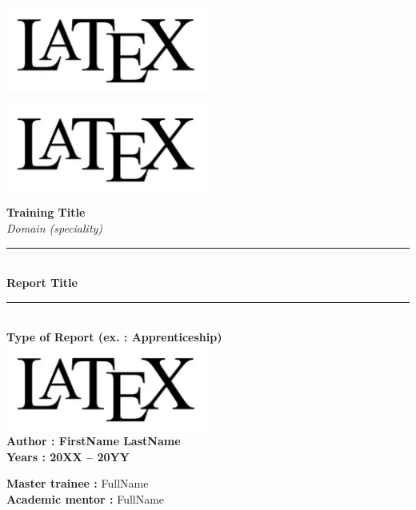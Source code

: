 
\begin{titlepage}
    \begin{minipage}{0.49\textwidth}
        \raggedright
        \includegraphics[width=0.5\textwidth]{images/latext_logo.png} %
    \end{minipage}
    \hfill
    \begin{minipage}{0.49\textwidth}
        \raggedleft
        \includegraphics[width=0.5\textwidth]{images/latext_logo.png} %
    \end{minipage}

    \vspace{2cm}
    \centering
    \vfill

    {\Large \textbf{Training Title} \\[0.5em]
    \textit{Domain (speciality)}} \\[2em]

    \textcolor{chapterColor}{\rule{\linewidth}{0.5pt}} \\[0.5em]
    {\Huge \textbf{Report Title}} \\[0.5em]
    \textcolor{chapterColor}{\rule{\linewidth}{0.5pt}} \\[1.5em]

    {\textbf{Type of Report (ex. : Apprenticeship)}} \\[3em]

    \includegraphics[width=0.5\textwidth]{images/latext_logo.png} %
    \\[3em]

    \textbf{Author : FirstName LastName} \\[0.5em]
    \textbf{Years : 20XX -- 20YY} \\[3em]

    \vfill
    \begin{flushleft}
        \textbf{Master trainee :} FullName \\[0.5em]
        \textbf{Academic mentor :} FullName
    \end{flushleft}
\end{titlepage}